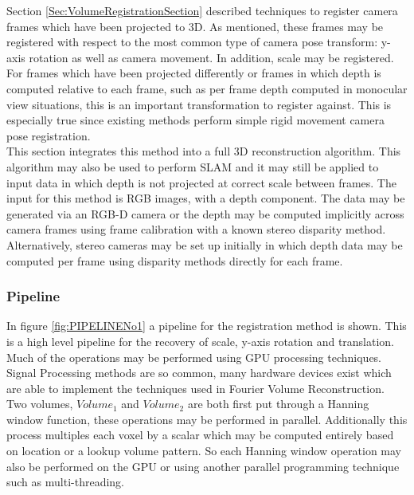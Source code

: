 
Section \ref{Sec:VolumeRegistrationSection} described techniques to register camera frames which have been projected to 3D. As mentioned, these frames may be registered with respect to the most common type of camera pose transform: y-axis rotation as well as camera movement. In addition, scale may be registered. For frames which have been projected differently or frames in which depth is computed relative to each frame, such as per frame depth computed in monocular view situations, this is an important transformation to register against. This is especially true since existing methods perform simple rigid movement camera pose registration. \\

This section integrates this method into a full 3D reconstruction algorithm. This algorithm may also be used to perform SLAM and it may still be applied to input data in which depth is not projected at correct scale between frames. The input for this method is RGB images, with a depth component. The data may be generated via an RGB-D camera or the depth may be computed implicitly across camera frames using frame calibration with a known stereo disparity method. Alternatively, stereo cameras may be set up initially in which depth data may be computed per frame using disparity methods directly for each frame. \\



\subsubsection{Pipeline}

\label{sec:FVRPipelineSect}

In figure \ref{fig:PIPELINENo1} a pipeline for the registration method is shown. This is a high level pipeline for the recovery of scale, y-axis rotation and translation. Much of the operations may be performed using GPU processing techniques. Signal Processing methods are so common, many hardware devices exist which are able to implement the techniques used in Fourier Volume Reconstruction. \\

Two volumes, $Volume_1$ and $Volume_2$ are both first put through a Hanning window function, these operations may be performed in parallel. Additionally this process multiples each voxel by a scalar which may be computed entirely based on location or a lookup volume pattern. So each Hanning window operation may also be performed on the GPU or using another parallel programming technique such as multi-threading. \\

